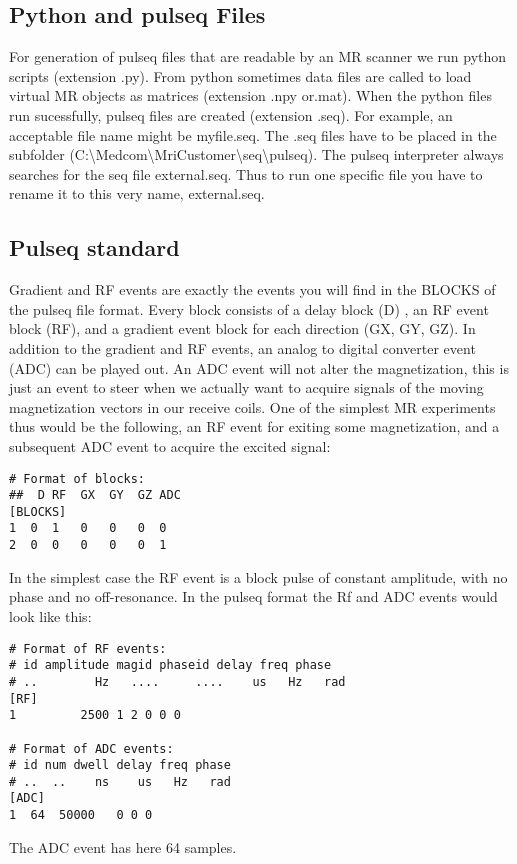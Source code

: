 \documentclass[a4paper,12pt]{extarticle}
\begin{document}
\subsection{Python and pulseq Files}
			For generation of pulseq files that are readable by an MR scanner we run python scripts (extension .py). From python sometimes data files are called to load virtual MR objects as matrices (extension .npy or.mat). When the python files run sucessfully, pulseq files are created (extension .seq). For example, an acceptable file name might be myfile.seq. 
            The .seq files have to be placed in the subfolder (C:\textbackslash Medcom\textbackslash MriCustomer\textbackslash seq\textbackslash pulseq). The pulseq interpreter always searches for the seq file external.seq. Thus to run one specific file you have to rename it to this very name, external.seq.
 
 
\subsection{ Pulseq standard}
Gradient and RF events are exactly the events you will find in the BLOCKS of the pulseq file format. Every block consists of a delay block (D) , an RF event block (RF), and a gradient event block for each direction (GX, GY, GZ). In addition to the gradient and RF events, an analog to digital converter event (ADC) can be played out. An ADC event will not alter the magnetization, this is just an event to steer when we actually want to acquire signals of the moving magnetization vectors in our receive coils. One of the simplest MR experiments thus would be the following,  an RF event for exiting some magnetization, and a subsequent ADC event to acquire the excited signal: 
\begin{lstlisting}
# Format of blocks:
##  D RF  GX  GY  GZ ADC
[BLOCKS]
1  0  1   0   0   0  0
2  0  0   0   0   0  1
\end{lstlisting}

In the simplest case the RF event is a block pulse of constant amplitude, with no phase and no off-resonance. In the pulseq format the Rf and ADC events would look like this:
\begin{lstlisting}
# Format of RF events:
# id amplitude magid phaseid delay freq phase
# ..        Hz   ....     ....    us   Hz   rad
[RF]
1         2500 1 2 0 0 0

# Format of ADC events:
# id num dwell delay freq phase
# ..  ..    ns    us   Hz   rad
[ADC]
1  64  50000   0 0 0
\end{lstlisting}
The ADC event has here 64 samples. 
\end{document}
